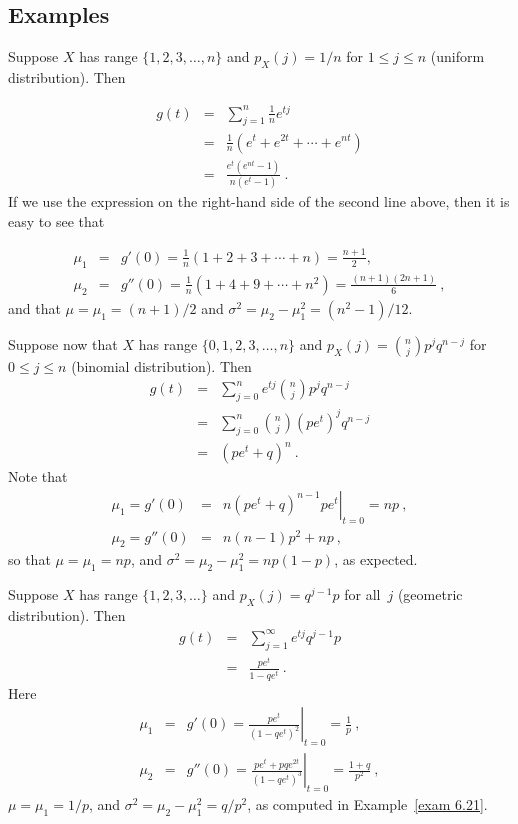 \subsection*{Examples}
\begin{example}\label{exam 10.1}
Suppose $X$ has range $\{1,2,3,\ldots,n\}$ and $p_X(j) = 1/n$ for $1 \leq j
\leq n$ (uniform distribution).  Then

\begin{eqnarray*}
g(t) &=& \sum_{j = 1}^n \frac 1n e^{tj} \\
     &=& \frac 1n (e^t + e^{2t} +\cdots+ e^{nt}) \\
     &=& \frac {e^t (e^{nt} - 1)} {n (e^t - 1)}\ .
\end{eqnarray*}
If we use the expression on the right-hand side of the second line above, then it is
easy to see that

\begin{eqnarray*}
\mu_1 &=& g'(0) = \frac 1n (1 + 2 + 3 + \cdots + n) = \frac {n + 1}2, \\
\mu_2 &=& g''(0) = \frac 1n (1 + 4 + 9+ \cdots + n^2) = \frac {(n + 1)(2n + 1)}6\ ,
\end{eqnarray*}
and that $\mu = \mu_1 = (n + 1)/2$ and $\sigma^2 = \mu_2 - \mu_1^2 = (n^2 -
1)/12$.
\end{example}

\begin{example}\label{exam 10.2}
Suppose now that $X$ has range $\{0,1,2,3,\ldots,n\}$ and $p_X(j) = {n \choose j} p^j
q^{n - j}$ for $0 \leq j \leq n$ (binomial distribution).  Then
\begin{eqnarray*}
g(t) &=& \sum_{j = 0}^n e^{tj} {n \choose j} p^j q^{n - j} \\
     &=& \sum_{j = 0}^n {n \choose j} (pe^t)^j q^{n - j} \\
     &=& (pe^t + q)^n\ .
\end{eqnarray*}
Note that
\begin{eqnarray*}
\mu_1 = g'(0) &=& \left. n(pe^t + q)^{n - 1}pe^t \right|_{t = 0} = np\ , \\
\mu_2 = g''(0) &=& n(n - 1)p^2 + np\ ,
\end{eqnarray*}
so that $\mu = \mu_1 = np$, and $\sigma^2 = \mu_2 - \mu_1^2 = np(1 - p)$, as
expected.
\end{example}

\begin{example}\label{exam 10.3}
Suppose $X$ has range $\{1,2,3,\ldots\}$ and $p_X(j) = q^{j - 1}p$ for all~$j$
(geometric distribution).  Then
\begin{eqnarray*}
g(t) &=& \sum_{j = 1}^\infty e^{tj} q^{j - 1}p \\
     &=& \frac {pe^t}{1 - qe^t}\ .
\end{eqnarray*}
Here
\begin{eqnarray*}
\mu_1 &=& g'(0) = \left. \frac {pe^t}{(1 - qe^t)^2} \right|_{t = 0} = \frac 1p\ , \\
\mu_2 &=& g''(0) = \left. \frac {pe^t + pqe^{2t}}{(1 - qe^t)^3} \right|_{t = 0} = \frac
{1 + q}{p^2}\ ,
\end{eqnarray*}
$\mu = \mu_1 = 1/p$, and $\sigma^2 = \mu_2 - \mu_1^2 = q/p^2$, as computed in
Example~\ref{exam 6.21}.
\end{example}

